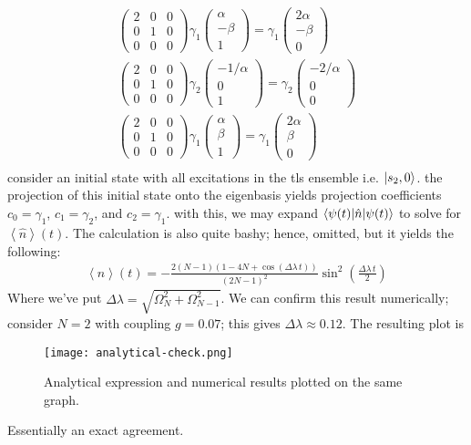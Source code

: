 \documentclass[10pt]{article}
\begin{document}
\begin{gather*}
    \begin{pmatrix} 2 & 0 & 0 \\ 0 & 1 & 0 \\ 0 & 0 & 0 \end{pmatrix}
    \gamma_1 \begin{pmatrix} \alpha \\ -\beta \\ 1 \end{pmatrix} = \gamma_1
    \begin{pmatrix} 2\alpha \\ - \beta \\ 0 \end{pmatrix} \\
    \begin{pmatrix} 2 & 0 & 0 \\ 0 & 1 & 0 \\ 0 & 0 & 0 \end{pmatrix}
    \gamma_2 \begin{pmatrix} - 1 / \alpha \\ 0 \\ 1 \end{pmatrix} = \gamma_2
    \begin{pmatrix} -2 / \alpha \\ 0 \\ 0 \end{pmatrix} \\
        \begin{pmatrix} 2 & 0 & 0 \\ 0 & 1 & 0 \\ 0 & 0 & 0 \end{pmatrix}
    \gamma_1 \begin{pmatrix} \alpha \\ \beta \\ 1 \end{pmatrix} = \gamma_1
    \begin{pmatrix} 2\alpha \\ \beta \\ 0 \end{pmatrix} \\
\end{gather*}
consider an initial state with all excitations in the tls ensemble i.e. 
$\ket{s_2, 0}$. the projection of this initial state onto the eigenbasis
yields projection coefficients $c_0 = \gamma_1$, $c_1 = \gamma_2$, and
$c_2 = \gamma_1$. with this, we may expand $\braket{\psi(t)|\hat{n} | \psi(t)}$
to solve for $\left < \hat{n} \right >(t)$. The calculation
is also quite bashy; hence, omitted, but it yields the following:
\begin{gather}
    \left < n \right > (t) = 
    -\frac{2(N-1)(1-4N + \cos (\Delta \lambda \, t)) 
    }{(2N-1)^2}
    \sin^2 \left(\frac{\Delta \lambda \,  t}{2}\right)
\end{gather}
Where we've put $\Delta \lambda = \sqrt{\Omega_N^2 + \Omega_{N-1}^2}$. We
can confirm this result numerically; consider $N = 2$ with coupling
$g = 0.07$; this gives $\Delta \lambda \approx 0.12$. The resulting plot is

\begin{center}    
    \begin{figure} [H]
        \texttt{[image: analytical-check.png]}
        \caption{Analytical expression and numerical results plotted on
        the same graph.}
    \end{figure}
\end{center}
Essentially an exact agreement. 
\end{document}
